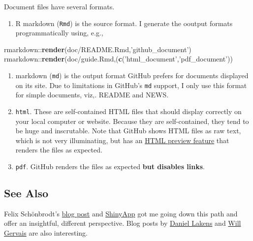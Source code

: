 \documentclass[]{article}
\newenvironment{Shaded}{\begin{snugshade}}{\end{snugshade}}
\newcommand{\KeywordTok}[1]{\textcolor[rgb]{0.13,0.29,0.53}{\textbf{{#1}}}}
\newcommand{\StringTok}[1]{\textcolor[rgb]{0.31,0.60,0.02}{{#1}}}
\newcommand{\NormalTok}[1]{{#1}}
\providecommand{\tightlist}{%
  \setlength{\itemsep}{0pt}\setlength{\parskip}{0pt}}
\begin{document}
Document files have several formats.

\begin{enumerate}
\def\labelenumi{\arabic{enumi}.}
\tightlist
\item
  R markdown (\texttt{Rmd}) is the source format. I generate the ooutput
  formats programmatically using, e.g.,
\end{enumerate}

\begin{Shaded}
\begin{Highlighting}[]
\NormalTok{rmarkdown::}\KeywordTok{render}\NormalTok{(doc/README.Rmd,}\StringTok{'github_document'}\NormalTok{)}
\NormalTok{rmarkdown::}\KeywordTok{render}\NormalTok{(doc/guide.Rmd,(}\KeywordTok{c}\NormalTok{(}\StringTok{'html_document'}\NormalTok{,}\StringTok{'pdf_document'}\NormalTok{))}
\end{Highlighting}
\end{Shaded}

\begin{enumerate}
\def\labelenumi{\arabic{enumi}.}
\setcounter{enumi}{1}
\tightlist
\item
  markdown (\texttt{md}) is the output format GitHub prefers for
  documents displayed on its site. Due to limitations in GitHub's
  \texttt{md} support, I only use this format for simple documents,
  viz,. README and NEWS.
\item
  \texttt{html}. These are self-contained HTML files that should display
  correctly on your local computer or website. Because they are
  self-contained, they tend to be huge and inscrutable. Note that GitHub
  shows HTML files as raw text, which is not very illuminating, but has
  an \href{http://htmlpreview.github.io}{HTML preview feature} that
  renders the files as expected.
\item
  \texttt{pdf}. GitHub renders the files as expected \textbf{but
  disables links}.
\end{enumerate}

\subsection{See Also}\label{see-also-1}

Felix Schönbrodt's
\href{http://www.nicebread.de/whats-the-probability-that-a-significant-p-value-indicates-a-true-effect/}{blog
post} and \href{http://shinyapps.org/apps/PPV/}{ShinyApp} got me going
down this path and offer an insightful, different perspective. Blog
posts by
\href{http://daniellakens.blogspot.de/2015/09/how-can-p-005-lead-to-wrong-conclusions.html}{Daniel
Lakens} and
\href{http://willgervais.com/blog/2014/9/24/power-consequences\%3E}{Will
Gervais} are also interesting.
\end{document}
